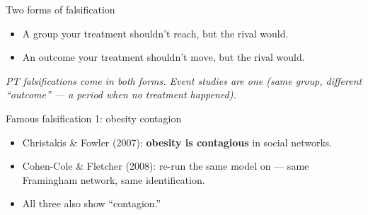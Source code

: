 \documentclass[aspectratio=169,11pt]{beamer}
\begin{document}
\begin{frame}{Two forms of falsification}
\vspace{0.6em}
\begin{itemize}\setlength\itemsep{0.7em}
  \item {} A group your treatment shouldn't reach, but the rival would. \\
  \item {} An outcome your treatment shouldn't move, but the rival would. \\
\end{itemize}
\vspace{0.6em}
\begin{center}
\small\color{warmgray}\itshape PT falsifications come in both forms. \;Event studies are one (same group, different ``outcome'' --- a period when no treatment happened).
\end{center}
\end{frame}

\begin{frame}{Famous falsification 1: obesity contagion}
\vspace{0.6em}
\begin{itemize}\setlength\itemsep{0.5em}
  \item Christakis \& Fowler (2007): \;\textbf{obesity is contagious} in social networks.
  \item Cohen-Cole \& Fletcher (2008): \;re-run the same model on  --- same Framingham network, same identification.
  \item All three also show ``contagion.''
\end{itemize}
\vspace{0.8em}
\vspace{0.4em}
\end{frame}
\end{document}
